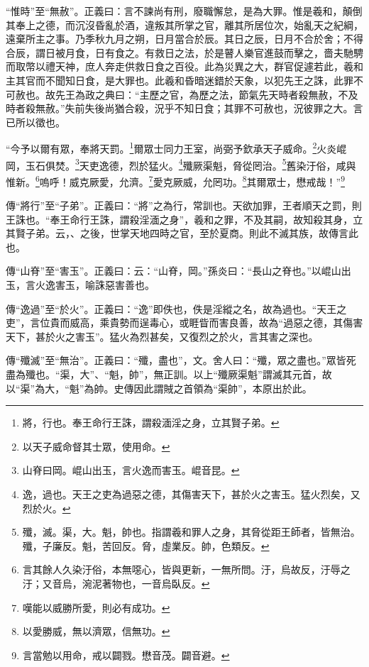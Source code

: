{\noindent\shu{}\fzkt “惟時”至“無赦”。正義曰：言不諫尚有刑，廢職懈怠，是為大罪。惟是羲和，顛倒其奉上之德，而沉沒昏亂於酒，違叛其所掌之官，離其所居位次，始亂天之紀綱，遠棄所主之事。乃季秋九月之朔，日月當合於辰。其日之辰，日月不合於舍；不得合辰，謂日被月食，日有食之。有救日之法，於是瞽人樂官進鼓而擊之，嗇夫馳騁而取幣以禮天神，庶人奔走供救日食之百役。此為災異之大，群官促遽若此，羲和主其官而不聞知日食，是大罪也。此羲和昏暗迷錯於天象，以犯先王之誅，此罪不可赦也。故先王為政之典曰：“主歷之官，為歷之法，節氣先天時者殺無赦，不及時者殺無赦。”失前失後尚猶合殺，況乎不知日食；其罪不可赦也，況彼罪之大。言已所以徵也。 \par}

“今予以爾有眾，奉將天罰。\footnote{將，行也。奉王命行王誅，謂殺湎淫之身，立其賢子弟。}爾眾士同力王室，尚弼予欽承天子威命。\footnote{以天子威命督其士眾，使用命。}火炎崐岡，玉石俱焚。\footnote{山脊曰岡。崐山出玉，言火逸而害玉。崐音昆。}天吏逸德，烈於猛火。\footnote{逸，過也。天王之吏為過惡之德，其傷害天下，甚於火之害玉。猛火烈矣，又烈於火。}殲厥渠魁，脅從罔治。\footnote{殲，滅。渠，大。魁，帥也。指謂羲和罪人之身，其脅從距王師者，皆無治。殲，子廉反。魁，苦回反。脅，虛業反。帥，色類反。}舊染汙俗，咸與惟新。\footnote{言其餘人久染汙俗，本無噁心，皆與更新，一無所問。汙，烏故反，汙辱之汙；又音烏，涴泥著物也，一音烏臥反。}嗚呼！威克厥愛，允濟。\footnote{嘆能以威勝所愛，則必有成功。}愛克厥威，允罔功。\footnote{以愛勝威，無以濟眾，信無功。}其爾眾士，懋戒哉！”\footnote{言當勉以用命，戒以闢戮。懋音茂。闢音避。}


{\noindent\zhuan{}\fzbyks 傳“將行”至“子弟”。正義曰：“將”之為行，常訓也。天欲加罪，王者順天之罰，則王誅也。“奉王命行王誅，謂殺淫湎之身”，羲和之罪，不及其嗣，故知殺其身，立其賢子弟。云，、之後，世掌天地四時之官，至於夏商。則此不滅其族，故傳言此也。 \par}

{\noindent\zhuan{}\fzbyks 傳“山脊”至“害玉”。正義曰：云：“山脊，岡。”孫炎曰：“長山之脊也。”以崐山出玉，言火逸害玉，喻誅惡害善也。 \par}

{\noindent\zhuan{}\fzbyks 傳“逸過”至“於火”。正義曰：“逸”即佚也，佚是淫縱之名，故為過也。“天王之吏”，言位貴而威高，乘貴勢而逞毒心，或睚眥而害良善，故為“過惡之德，其傷害天下，甚於火之害玉”。猛火為烈甚矣，又復烈之於火，言其害之深也。 \par}

{\noindent\zhuan{}\fzbyks 傳“殲滅”至“無治”。正義曰：“殲，盡也”，文。舍人曰：“殲，眾之盡也。”眾皆死盡為殲也。“渠，大”、“魁，帥”，無正訓。以上“殲厥渠魁”謂滅其元首，故以“渠”為大，“魁”為帥。史傳因此謂賊之首領為“渠帥”，本原出於此。 \par}

